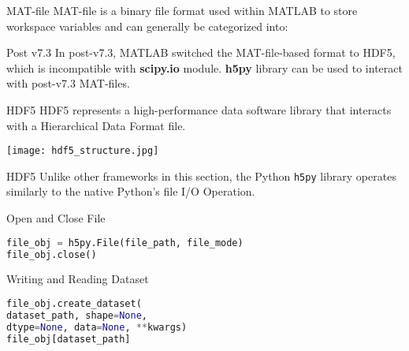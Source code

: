 \documentclass{beamer}
\begin{document}
\begin{frame}[fragile]{MAT-file}
MAT-file is a binary file format used within MATLAB to store workspace variables and can generally be categorized into:
    \begin{block}{Post v7.3}
        In post-v7.3, MATLAB switched the MAT-file-based format to HDF5, which is incompatible with \textbf{scipy.io} module. \textbf{h5py} library can be used to interact with post-v7.3 MAT-files.
    \end{block}
\end{frame}

\begin{frame}[fragile]{HDF5}
    HDF5 represents a high-performance data software library that interacts with a Hierarchical Data Format file.
    \begin{center}
        \texttt{[image: hdf5\_structure.jpg]}
    \end{center}
\end{frame}
\begin{frame}[fragile]{HDF5}
    Unlike other frameworks in this section, the Python \lstinline[language=Python]{h5py} library operates similarly to the native Python's file I/O Operation.
    \begin{block}{Open and Close File}
        \begin{lstlisting}[language=Python]
file_obj = h5py.File(file_path, file_mode)
file_obj.close()
        \end{lstlisting}
    \end{block}
    \begin{block}{Writing and Reading Dataset}
        \begin{lstlisting}[language=Python]
file_obj.create_dataset(
dataset_path, shape=None,
dtype=None, data=None, **kwargs)
file_obj[dataset_path]
        \end{lstlisting}
    \end{block}
\end{frame}
\end{document}

